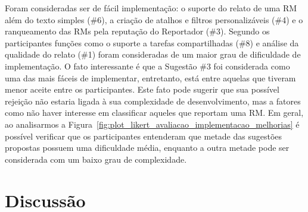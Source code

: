 Foram consideradas ser de fácil implementação: o suporte do relato de uma RM
além do texto simples (\#6), a criação de atalhos e filtros personalizáveis
(\#4) e o ranqueamento das RMs pela reputação do Reportador (\#3). Segundo os
participantes funções como o suporte a tarefas compartilhadas (\#8) e análise da
qualidade do relato (\#1) foram consideradas de um maior grau de dificuldade de
implementação. O fato interessante é que a Sugestão \#3 foi considerada como
uma das mais fáceis de implementar, entretanto, está entre aquelas que tiveram
menor aceite entre os participantes. Este fato pode sugerir que sua possível
rejeição não estaria ligada à sua complexidade de desenvolvimento, mas a fatores
como não haver interesse em classificar aqueles que reportam uma RM\@. Em geral,
ao analisarmos a Figura~\ref{fig:plot_likert_avaliacao_implementacao_melhorias}
é possível verificar que os participantes entenderam que metade das sugestões
propostas possuem uma dificuldade média, enquanto a outra metade pode ser
considerada com um baixo grau de complexidade.

\begin{table}[htpb]
\centering
{}
\caption{Ordenamento das sugestões pelo grau de dificuldade.}
\label{tab:ranking_implementacao_sug_melhorias}
\end{table}

\section{Discussão}
\label{sec:sug_melhoria_discussao}

